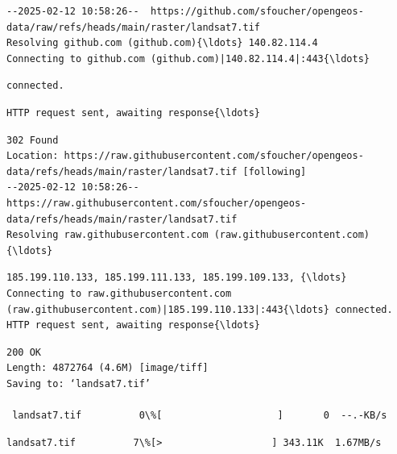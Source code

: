 \documentclass[11pt]{article}
\begin{document}
    \begin{Verbatim}[commandchars=\\\{\}]
--2025-02-12 10:58:26--  https://github.com/sfoucher/opengeos-
data/raw/refs/heads/main/raster/landsat7.tif
Resolving github.com (github.com){\ldots} 140.82.114.4
Connecting to github.com (github.com)|140.82.114.4|:443{\ldots}
    \end{Verbatim}

    \begin{Verbatim}[commandchars=\\\{\}]
connected.
    \end{Verbatim}

    \begin{Verbatim}[commandchars=\\\{\}]
HTTP request sent, awaiting response{\ldots}
    \end{Verbatim}

    \begin{Verbatim}[commandchars=\\\{\}]
302 Found
Location: https://raw.githubusercontent.com/sfoucher/opengeos-
data/refs/heads/main/raster/landsat7.tif [following]
--2025-02-12 10:58:26--  https://raw.githubusercontent.com/sfoucher/opengeos-
data/refs/heads/main/raster/landsat7.tif
Resolving raw.githubusercontent.com (raw.githubusercontent.com){\ldots}
    \end{Verbatim}

    \begin{Verbatim}[commandchars=\\\{\}]
185.199.110.133, 185.199.111.133, 185.199.109.133, {\ldots}
Connecting to raw.githubusercontent.com
(raw.githubusercontent.com)|185.199.110.133|:443{\ldots} connected.
HTTP request sent, awaiting response{\ldots}
    \end{Verbatim}

    \begin{Verbatim}[commandchars=\\\{\}]
200 OK
Length: 4872764 (4.6M) [image/tiff]
Saving to: ‘landsat7.tif’

 landsat7.tif          0\%[                    ]       0  --.-KB/s
    \end{Verbatim}

    \begin{Verbatim}[commandchars=\\\{\}]
 landsat7.tif          7\%[>                   ] 343.11K  1.67MB/s
    \end{Verbatim}
\end{document}
